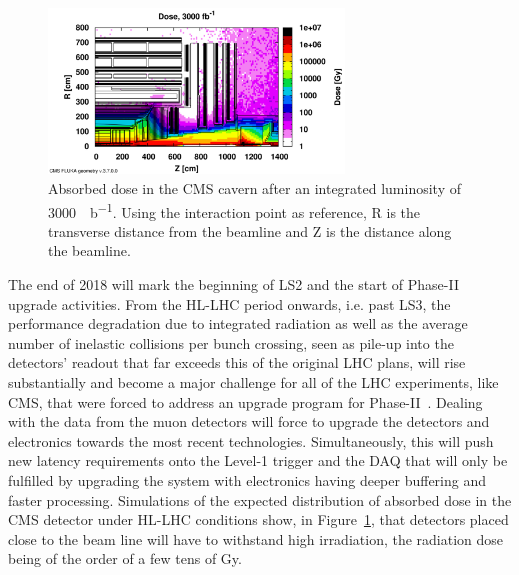 	\begin{figure}[H]
		\centering
		\includegraphics[width=0.7\textwidth]{fig/chapt3/HL-LHC-Dose.png}
		\caption{\label{fig:Dose} Absorbed dose in the CMS cavern after an integrated luminosity of \SI{3000}{\femto\per\barn}. Using the interaction point as reference, R is the transverse distance from the beamline and Z is the distance along the beamline.}
	\end{figure}

	The end of 2018 will mark the beginning of LS2 and the start of Phase-II upgrade activities. From the HL-LHC period onwards, i.e. past LS3, the performance degradation due to integrated radiation as well as the average number of inelastic collisions per bunch crossing, seen as pile-up into the detectors' readout that far exceeds this of the original LHC plans, will rise substantially and become a major challenge for all of the LHC experiments, like CMS, that were forced to address an upgrade program for Phase-II~\cite{PHASEIITP}. Dealing with the data from the muon detectors will force to upgrade the detectors and electronics towards the most recent technologies. Simultaneously, this will push new latency requirements onto the Level-1 trigger and the \acf{DAQ} that will only be fulfilled by upgrading the system with electronics having deeper buffering and faster processing. Simulations of the expected distribution of absorbed dose in the CMS detector under HL-LHC conditions show, in Figure~\ref{fig:Dose}, that detectors placed close to the beam line will have to withstand high irradiation, the radiation dose being of the order of a few tens of \si{Gy}.
	
